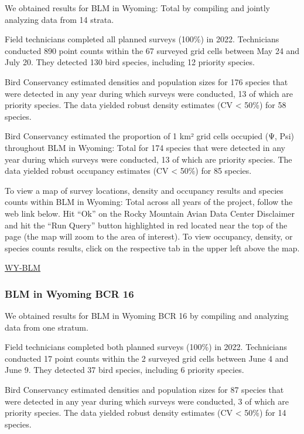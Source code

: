 \documentclass[
  letterpaper,
  DIV=11,
  numbers=noendperiod,
  oneside]{scrreprt}
\begin{document}
We obtained results for BLM in Wyoming: Total by compiling and jointly
analyzing data from 14 strata.

Field technicians completed all planned surveys (100\%) in 2022.
Technicians conducted 890 point counts within the 67 surveyed grid cells
between May 24 and July 20. They detected 130 bird species, including 12
priority species.

Bird Conservancy estimated densities and population sizes for 176
species that were detected in any year during which surveys were
conducted, 13 of which are priority species. The data yielded robust
density estimates (CV \textless{} 50\%) for 58 species.

Bird Conservancy estimated the proportion of 1 km² grid cells occupied
(Ψ, Psi) throughout BLM in Wyoming: Total for 174 species that were
detected in any year during which surveys were conducted, 13 of which
are priority species. The data yielded robust occupancy estimates (CV
\textless{} 50\%) for 85 species.

To view a map of survey locations, density and occupancy results and
species counts within BLM in Wyoming: Total across all years of the
project, follow the web link below. Hit ``Ok'' on the Rocky Mountain
Avian Data Center Disclaimer and hit the ``Run Query'' button
highlighted in red located near the top of the page (the map will zoom
to the area of interest). To view occupancy, density, or species counts
results, click on the respective tab in the upper left above the map.

\href{http://www.rmbo.org/new_site/adc/QueryWindow.aspx\#N4IgzgrgDgpgTmALnAhoiBbEAuABCAdQE0BaAIQBkBZEAXyA}{WY-BLM}

\hypertarget{blm-in-wyoming-bcr-16}{%
\subsubsection{BLM in Wyoming BCR 16}\label{blm-in-wyoming-bcr-16}}

We obtained results for BLM in Wyoming BCR 16 by compiling and analyzing
data from one stratum.

Field technicians completed both planned surveys (100\%) in 2022.
Technicians conducted 17 point counts within the 2 surveyed grid cells
between June 4 and June 9. They detected 37 bird species, including 6
priority species.

Bird Conservancy estimated densities and population sizes for 87 species
that were detected in any year during which surveys were conducted, 3 of
which are priority species. The data yielded robust density estimates
(CV \textless{} 50\%) for 14 species.
\end{document}
